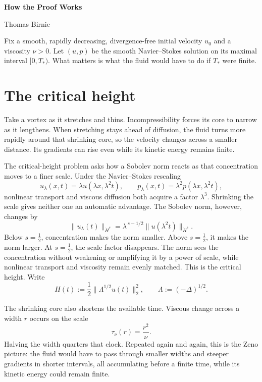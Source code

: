 \documentclass[12pt]{article}
\begin{document}
\begin{center}
  {\LARGE\bfseries How the Proof Works}\par
  \vspace{0.4\baselineskip}
  {\normalsize Thomas Birnie}\par
\end{center}

\vspace{0.65\baselineskip}

Fix a smooth, rapidly decreasing, divergence-free initial velocity \(u_0\) and
a viscosity \(\nu>0\). Let \((u,p)\) be the smooth Navier--Stokes solution on
its maximal interval \([0,T_*)\). What matters is what the fluid would have to
do if \(T_*\) were finite.

\section*{The critical height}

Take a vortex as it stretches and thins. Incompressibility forces its core to
narrow as it lengthens. When stretching stays ahead of diffusion, the fluid
turns more rapidly around that shrinking core, so the velocity changes across a
smaller distance. Its gradients can rise even while its kinetic energy remains
finite.

The critical-height problem asks how a Sobolev norm reacts as that concentration
moves to a finer scale. Under the Navier--Stokes rescaling
\[
  u_\lambda(x,t)=\lambda u(\lambda x,\lambda^2t),
  \qquad
  p_\lambda(x,t)=\lambda^2p(\lambda x,\lambda^2t),
\]
nonlinear transport and viscous diffusion both acquire a factor \(\lambda^3\).
Shrinking the scale gives neither one an automatic advantage. The Sobolev norm,
however, changes by
\[
  \|u_\lambda(t)\|_{\dot H^s}
  =
  \lambda^{\,s-1/2}
  \|u(\lambda^2t)\|_{\dot H^s}.
\]
Below \(s=\tfrac12\), concentration makes the norm smaller. Above
\(s=\tfrac12\), it makes the norm larger. At \(s=\tfrac12\), the scale factor
disappears. The norm sees the concentration without weakening or amplifying it
by a power of scale, while nonlinear transport and viscosity remain evenly
matched. This is the critical height. Write
\[
  H(t)
  :=
  \frac12\|\Lambda^{1/2}u(t)\|_2^2,
  \qquad
  \Lambda:=(-\Delta)^{1/2}.
\]

The shrinking core also shortens the available time. Viscous change across a
width \(r\) occurs on the scale
\[
  \tau_\nu(r)=\frac{r^2}{\nu}.
\]
Halving the width quarters that clock. Repeated again and again, this is the
Zeno picture: the fluid would have to pass through smaller widths and steeper
gradients in shorter intervals, all accumulating before a finite time, while
its kinetic energy could remain finite.
\end{document}
